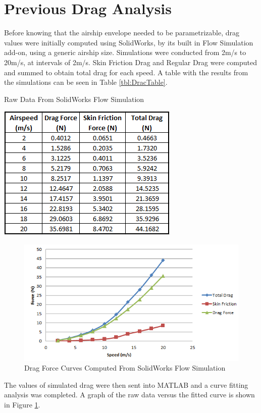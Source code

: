 \documentclass[../main.tex]{subfiles}
\begin{document}
\section{Previous Drag Analysis}

Before knowing that the airship envelope needed to be parametrizable, drag values were initially computed using SolidWorks, by its built in Flow Simulation add-on, using a generic airship size. Simulations were conducted from 2m/s to 20m/s, at intervals of 2m/s. Skin Friction Drag and Regular Drag were computed and summed to obtain total drag for each speed. A table with the results from the simulations can be seen in Table \ref{tbl:DracTable}.

\begin{table}[H]
	\centering
	\caption{Raw Data From SolidWorks Flow Simulation}
	\includegraphics[width=.5\linewidth]{img/drag/dragTable.PNG}
	\label{tbl:DracTable}
\end{table}

\begin{figure}[H]
	\centering
	\includegraphics[width=\linewidth]{img/drag/dragForces.PNG}
	\caption{Drag Force Curves Computed From SolidWorks Flow Simulation}
	\label{fig:dragForces}
\end{figure}

The values of simulated drag were then sent into MATLAB and a curve fitting analysis was completed. A graph of the raw data versus the fitted curve is shown in Figure \ref{fig:dragForces}.
\end{document}
